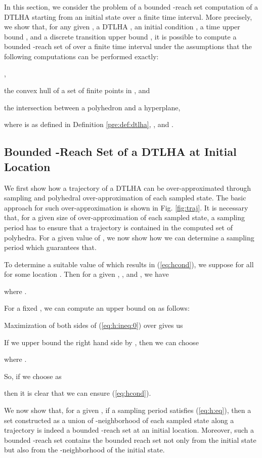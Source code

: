 In this section, we consider the problem of a bounded -reach set computation of a DTLHA starting from an initial state over a finite time interval.
More precisely, we show that, for any given , a DTLHA , an initial condition , a time upper bound , and a discrete transition upper bound , it is possible to compute a bounded -reach set of  over a finite time interval  under the assumptions that the following computations can be performed exactly:
\begin{inparaenum}[(i)]
	\item  ,
	\item the convex hull of a set of finite points in , and
	\item the intersection between a polyhedron and a hyperplane,
\end{inparaenum}
where  is as defined in Definition \ref{pre:def:dtlha}, , and .



\subsection{Bounded -Reach Set of a DTLHA at Initial Location}  \label{sec:theory:l0}

We first show how a trajectory of a DTLHA can be over-approximated through sampling and polyhedral over-approximation of each sampled state.
The basic approach for such over-approximation is shown in Fig. \ref{fig:traj}. 
It is necessary that, for a given size of over-approximation of each sampled state, a sampling period  has to ensure that a trajectory  is contained in the computed set of polyhedra.
For a given value of , we now show how we can determine a sampling period  which guarantees that.


To determine a suitable value of  which results in (\ref{eq:hcond}), we suppose  for all  for some location .
Then for a given , , and , we have 


where . 

For a fixed , we can compute an upper bound on  as follows:


Maximization of both sides of (\ref{eq:h:ineq:0}) over  gives us 


If we upper bound the right hand side by , then we can choose 

where  .

So, if we choose  as 

then it is clear that we can ensure (\ref{eq:hcond}). 

We now show that, for a given , if a sampling period  satisfies (\ref{eq:h:eq}), then a set constructed as a union of -neighborhood of each sampled state along a trajectory is indeed a bounded -reach set at an initial location.  
Moreover, such a bounded -reach set contains the bounded reach set not only from the initial state but also from the -neighborhood of the initial state.

